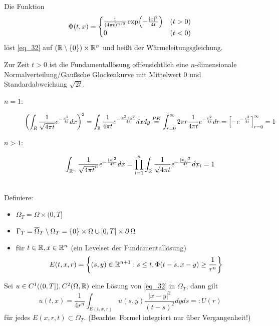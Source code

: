 \begin{defn}[Fundamentallösung] \label{def_83}
	Die Funktion \marginnote{[83]}
	\[ \Phi(t,x) = \begin{cases}
		\frac{1}{(4\pi t)^{n/2}} \exp \enbrace*{ - \frac{|x|^2}{4t}} & (t > 0) \\
		0 & (t < 0) \end{cases} \]
	löst \eqref{eq_32} auf $(\RR \setminus \setnull) \times \RR^n$ und heißt  der Wärmeleitungsgleichung.
\end{defn}
	
\begin{bem} \label{bem_84}
	Zur Zeit $t > 0$ \marginnote{[84]} ist die Fundamentallösung offfensichtlich eine $n$-dimensionale Normalverteilung/Gaußsche Glockenkurve mit Mittelwert 0 und Standardabweichung $\sqrt{2t}$.
\end{bem}
	
	\begin{description}
		\item[$n=1$:]
		\[ \enbrace*{ \int_R \frac{1}{\sqrt{4 \pi t}} e^{-\frac{x^2}{4t}} dx}^2 = \int_{\RR} \frac{1}{4\pi t} e^{-\frac{x^2+y^2}{4t}} dxdy \overset{PK}{=} \int_{r=0}^{\infty} 2\pi r \frac{1}{4\pi t} e^{-\frac{r^2}{4t}} dr = \left \lbrack -e^{- \frac{r^2}{4t}} \right\rbrack_{r=0}^\infty = 1 \]
		\item[$n > 1$:]
		\[ \int_{\RR^n} \frac{1}{\sqrt{4\pi t}^n} e^{- \frac{|x|^2}{4t}} dx = \prod\limits_{i=1}^{n} \int_{\RR} \frac{1}{\sqrt{4\pi t}} e^{-\frac{|x_i|^2}{4t}} dx_i = 1 \]
	\end{description}
	
\mbox{} \\
Definiere: \begin{itemize}
	\item $\Omega_T = \Omega \times (0,T]$ \\
	\item $\Gamma_T = \overline{\Omega}_T \setminus \Omega_T = \setnull \times \Omega \cup [0,T] \times \der \Omega$
	\item {} für $t \in \RR, x \in \RR^n$ (ein Levelset der Fundamentallösung)
	\[ E(t,x,r) = \penbrace*{(s,y) \in \RR^{n+1} : s \leq t, \Phi(t-s,x-y) \geq \frac{1}{r^n}} \]
\end{itemize}

\begin{thm}[Mittelwertformel] \label{thm_85}
	Sei $u \in C^1((0,T]),C^2(\Omega,\RR)$ eine Lösung von \eqref{eq_32} in $\Omega_T$, dann gilt \marginnote{[85]}
	\begin{equation}
		u(t,x) = \frac{1}{4r^n} \int_{E(t,x,r)} u(s,y) \frac{|x-y|^2}{(t-s)^2} dyds =: U(r) \label{eq_33}
	\end{equation}
	für jedes $E(x,r,t) \subset \Omega_T$. (Beachte: Formel integriert nur über Vergangenheit!)
\end{thm}
	
